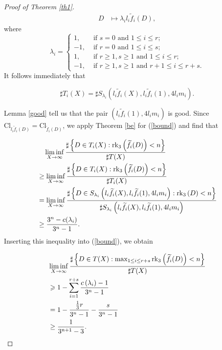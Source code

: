 \documentclass{amsart}
\begin{document}
\begin{proof}[Proof of Theorem \ref{th1}]
\[\begin{aligned}
D & \longmapsto  \lambda_i l_{i} \widetilde{f}_{i}(D),
\end{aligned}
\]
where
\[\lambda_i=\left\{
              \begin{array}{ll}
              1, &\text{ if }s=0 \text{ and } 1\le i\le r; \\
                -1, & \text{ if }r=0 \text{ and }   1\le i\le  s; \\
                1, &\text{ if }r\ge1,s\ge1 \text{ and }  1\le i\le r; \\
                -1, &\text{ if }r\ge1,s\ge1 \text{ and } r+1\le i\le r+s.
              \end{array}
            \right.
\]
It follows immediately that

\[
\sharp T_{i}(X)=\sharp S_{\lambda_i}\left( l_{i} \widetilde{f}_{i}(X),  l_{i} \widetilde{f}_{i}(1), 4 l_{i} m_{i}\right).
\]


Lemma \ref{good} tell us that the pair $( l_{i} \widetilde{f}_{i}(1), 4  l_{i} m_{i})$ is good. Since   $\mathrm{Cl}_{l_i\widetilde{f}_{i} (D)}=\mathrm{Cl}_{\widetilde{f}_{i}(D)}$, we apply Theorem \ref{be} for (\ref{bound}) and find that

\begin{align*}
&\quad \liminf_{X\rightarrow\infty} \frac{\sharp\left\{D \in T_{i}(X): \operatorname{rk}_{3}\left({\widetilde{f}_{i}(D)}\right)< n\right\}}{\sharp T(X)}\notag \\
& \ge\liminf_{X\rightarrow\infty} \frac{\sharp\left\{D \in T_{i}(X): \operatorname{rk}_{3}\left({\widetilde{f}_{i}(D)}\right)< n\right\}}{\sharp T_{i}(X)}\notag \\
&=  \liminf_{X\rightarrow\infty} \frac{\sharp\left\{D \in S_{\lambda_i}\left( l_{i}   \widetilde{f}_{i}(X),  l_{i} \widetilde{f}_{i}(1), 4  l_{i} m_{i}\right): \operatorname{rk}_{3}\left({D}\right)< n\right\}}{\sharp S_{\lambda_i}\left( l_{i}  \widetilde{f}_{i}(X),  l_{i} \widetilde{f}_{i}(1), 4  l_{i} m_{i}\right)}\notag\\
&\ge\frac{3^n-c(\lambda_i) }{3^n-1}.
\end{align*}
Inserting this inequality  into (\ref{bound}), we obtain

\begin{align}
&\liminf_{X \rightarrow \infty} \frac{\sharp\left\{D \in T(X): \max _{1 \le i \le r+s} \operatorname{rk}_{3}\left({\widetilde{f}_{i}(D)}\right)<n\right\}}{\sharp T(X)}\notag\\
&\geqslant  1-\sum_{i=1}^{r+s} \frac{c\left(\lambda_i\right)-1}{3^{n}-1}\notag\\
&=1-\frac{\frac{1}{3}r}{3^{n }-1}-\frac{s}{3^{n}-1}\notag\\
&\ge \frac{1}{3^{n+1}-3}. \label{bound1}
\end{align}


\end{proof}
\end{document}

